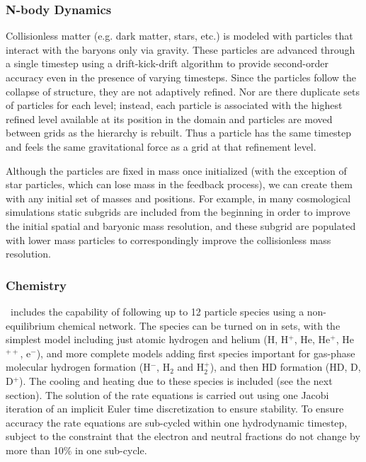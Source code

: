 \subsubsection{N-body Dynamics}

Collisionless matter (e.g. dark matter, stars, etc.) is modeled with
particles that interact with the baryons only via gravity.  These
particles are advanced through a single timestep using a drift-kick-drift
algorithm \citep{Hockney88} to provide second-order accuracy even in
the presence of varying timesteps.  Since the particles follow the
collapse of structure, they are not adaptively refined.  Nor are there
duplicate sets of particles for each level; instead, each particle is
associated with the highest refined level available at its position in
the domain and particles are moved between grids as the hierarchy is
rebuilt. Thus a particle has the same timestep and feels the same
gravitational force as a grid at that refinement level.

Although the particles are fixed in mass once initialized (with the
exception of star particles, which can lose mass in the feedback
process), we can create them with any initial set of masses and
positions.  For example, in many cosmological simulations static
subgrids are included from the beginning in order to improve the
initial spatial and baryonic mass resolution, and these subgrid are
populated with lower mass particles to correspondingly improve the
collisionless mass resolution.

\subsubsection{Chemistry}
\label{sec.ov.chem}

\enzo\ includes the capability of following up to 12 particle species
using a non-equilibrium chemical network.  The species can be turned
on in sets, with the simplest model including just atomic hydrogen and
helium (H, H$^+$, He, He$^+$, He$^{++}$, e$^-$), and more complete
models adding first species important for gas-phase molecular hydrogen
formation (H$^-$, H$_2$ and H$_2^+$), and then HD formation (HD, D,
D$^+$).
The cooling and heating due to these species is included (see the next
section). The solution of the rate equations is carried out using one
Jacobi iteration of an implicit Euler time discretization to ensure
stability. To ensure accuracy the rate equations are sub-cycled
within one hydrodynamic timestep, subject to the constraint that the
electron and neutral fractions do not change by more than 10\% in one
sub-cycle.

